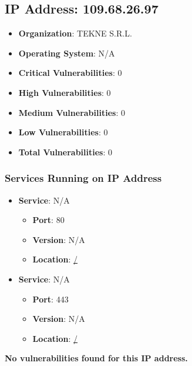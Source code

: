 \documentclass{article}
\begin{document}
\clearpage



\subsection*{IP Address: 109.68.26.97}

\begin{itemize}
    \item \textbf{Organization}: TEKNE S.R.L.
    \item \textbf{Operating System}:  N/A 
    \item \textbf{Critical Vulnerabilities}: 0
    \item \textbf{High Vulnerabilities}: 0
    \item \textbf{Medium Vulnerabilities}: 0
    \item \textbf{Low Vulnerabilities}: 0
    \item \textbf{Total Vulnerabilities}: 0
\end{itemize}

\subsubsection*{Services Running on IP Address}

\begin{itemize}
    
        \item \textbf{Service}: N/A
        \begin{itemize}
            \item \textbf{Port}: 80
            \item \textbf{Version}:  N/A 
            \item \textbf{Location}: \href{ / }{ / }
        \end{itemize}
    
        \item \textbf{Service}: N/A
        \begin{itemize}
            \item \textbf{Port}: 443
            \item \textbf{Version}:  N/A 
            \item \textbf{Location}: \href{ / }{ / }
        \end{itemize}
    
\end{itemize}


\textbf{No vulnerabilities found for this IP address.}
\end{document}
